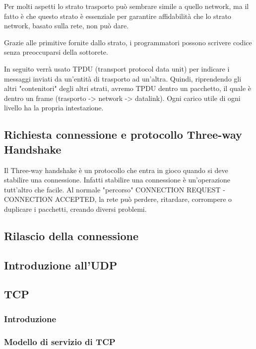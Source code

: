 Per molti aspetti lo strato trasporto può sembrare simile a quello network, ma il fatto è che questo strato è essenziale per garantire affidabilità che lo strato network, basato sulla rete, non può dare. 

Grazie alle primitive fornite dallo strato, i programmatori possono scrivere codice senza preoccuparsi della sottorete.

In seguito verrà usato TPDU (transport protocol data unit) per indicare i messaggi inviati da un'entità di trasporto ad un'altra. 
Quindi, riprendendo gli altri "contenitori" degli altri strati, avremo TPDU dentro un pacchetto, il quale è dentro un frame
(trasporto -> network -> datalink).
Ogni carico utile di ogni livello ha la propria intestazione. 

\subsection{Richiesta connessione e protocollo Three-way Handshake}

Il Three-way handshake è un protocollo che entra in gioco quando si deve stabilire una connessione.
Infatti stabilire una connessione è un'operazione tutt'altro che facile.
Al normale "percorso" CONNECTION REQUEST - CONNECTION ACCEPTED, la rete può perdere, ritardare, corrompere o duplicare i pacchetti, creando diversi problemi.


\subsection{Rilascio della connessione}

\subsection{Introduzione all'UDP}

\subsection{TCP}

\subsubsection{Introduzione}


\subsubsection{Modello di servizio di TCP}


